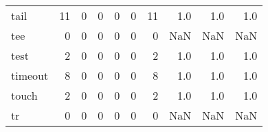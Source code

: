 \begin{longtable}{lrrrrrrrrr}
tail      &                                      11 &                                                  0 &                                                  0 &                                                  0 &                                                  0 &                                                 11 &                                                1.0 &                                    1.0 &                                  1.0 \\
tee       &                                       0 &                                                  0 &                                                  0 &                                                  0 &                                                  0 &                                                  0 &                                                NaN &                                    NaN &                                  NaN \\
test      &                                       2 &                                                  0 &                                                  0 &                                                  0 &                                                  0 &                                                  2 &                                                1.0 &                                    1.0 &                                  1.0 \\
timeout   &                                       8 &                                                  0 &                                                  0 &                                                  0 &                                                  0 &                                                  8 &                                                1.0 &                                    1.0 &                                  1.0 \\
touch     &                                       2 &                                                  0 &                                                  0 &                                                  0 &                                                  0 &                                                  2 &                                                1.0 &                                    1.0 &                                  1.0 \\
tr        &                                       0 &                                                  0 &                                                  0 &                                                  0 &                                                  0 &                                                  0 &                                                NaN &                                    NaN &                                  NaN \\

\end{longtable}
